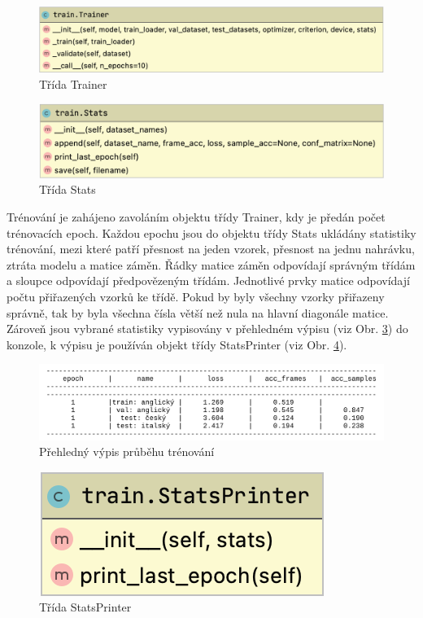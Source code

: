 \documentclass[FM,BP]{tulthesis}
\begin{document}
\begin{figure}[ht]
\centerline{\includegraphics[scale=.3]{train-trainer.png}}
\caption{Třída Trainer}
\label{fig:trainer}
\end{figure}
\FloatBarrier

\begin{figure}[ht]
\centerline{\includegraphics[scale=.33]{train-stats.png}}
\caption{Třída Stats}
\label{fig:stats}
\end{figure}
\FloatBarrier

Trénování je zahájeno zavoláním objektu třídy Trainer, kdy je předán počet trénovacích epoch. Každou epochu jsou do objektu třídy Stats ukládány statistiky trénování, mezi které patří přesnost na jeden vzorek, přesnost na jednu nahrávku, ztráta modelu a matice záměn. Řádky matice záměn odpovídají správným třídám a sloupce odpovídají předpovězeným třídám. Jednotlivé prvky matice odpovídají počtu přiřazených vzorků ke třídě. Pokud by byly všechny vzorky přiřazeny správně, tak by byla všechna čísla větší než nula na hlavní diagonále matice. Zároveň jsou vybrané statistiky vypisovány v přehledném výpisu (viz Obr. \ref{fig:print}) do konzole, k výpisu je používán objekt třídy StatsPrinter (viz Obr. \ref{fig:printer}).

\begin{figure}[ht]
\centerline{\includegraphics[scale=.215]{train_log.png}}
\caption{Přehledný výpis průběhu trénování}
\label{fig:print}
\end{figure}
\FloatBarrier

\begin{figure}[ht]
\centerline{\includegraphics[scale=.32]{train-stats_printer.png}}
\caption{Třída StatsPrinter}
\label{fig:printer}
\end{figure}
\FloatBarrier
\end{document}
